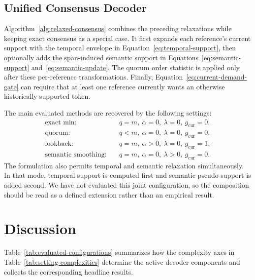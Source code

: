 \documentclass{article}
\begin{document}
\subsection{Unified Consensus Decoder}
\label{sec:unified-decoder}

Algorithm~\ref{alg:relaxed-consensus} combines the preceding relaxations while
keeping exact consensus as a special case. It first expands each reference's
current support with the temporal envelope in
Equation~\ref{eq:temporal-support}, then optionally adds the span-induced
semantic support in Equations~\ref{eq:semantic-support}
and~\ref{eq:semantic-update}. The quorum order statistic is applied only after
these per-reference transformations. Finally,
Equation~\ref{eq:current-demand-gate} can require that at least one reference
currently wants an otherwise historically supported token.

The main evaluated methods are recovered by the following settings:
\begin{align*}
\text{exact min:}\quad
&q=m,\ \alpha=0,\ \lambda=0,\ g_{\mathrm{cur}}=0,\\
\text{quorum:}\quad
&q<m,\ \alpha=0,\ \lambda=0,\ g_{\mathrm{cur}}=0,\\
\text{lookback:}\quad
&q=m,\ \alpha>0,\ \lambda=0,\ g_{\mathrm{cur}}=1,\\
\text{semantic smoothing:}\quad
&q=m,\ \alpha=0,\ \lambda>0,\ g_{\mathrm{cur}}=0.
\end{align*}
The formulation also permits temporal and semantic relaxation simultaneously.
In that mode, temporal support is computed first and semantic pseudo-support
is added second. We have not evaluated this joint configuration, so the
composition should be read as a defined extension rather than an empirical
result.

\section{Discussion}
\label{sec:discussion}

Table~\ref{tab:evaluated-configurations} summarizes how the complexity axes in
Table~\ref{tab:setting-complexities} determine the active decoder components
and collects the corresponding headline results.
\end{document}
